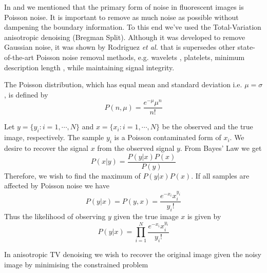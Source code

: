 \begin{definition}
	In  and  we mentioned that the primary form of noise in fluorescent images is Poisson noise. It is important to remove as much noise as possible without dampening the boundary information. To this end we've used the Total-Variation anisotropic denoising (Bregman Split). Although it was developed to remove Gaussian noise, it was shown by Rodriguez \textit{et al.}\citep{Rodriguez2008} that is supersedes other state-of-the-art Poisson noise removal methods, e.g.  wavelets \citep{Timmermann1999}, platelets\citep{Willett2004}, minimum description length \citep{Nowak1999}, while maintaining signal integrity. 
	
	The Poisson distribution, which has equal mean and standard deviation i.e. $\mu = \sigma$, is defined by
	\begin{equation}
	P(n,\mu) = \frac{e^{-\mu}\mu^{n}}{n!}
	\label{eq:poissondist}
	\end{equation}
	
	Let $y = \lbrace y_i:i=1, \cdots, N \rbrace$ and $x = \lbrace x_i:i=1, \cdots, N \rbrace$ be the observed and the true image, respectively. The sample $y_i$ is a Poisson contaminated form of $x_i$. We desire to recover the signal $x$ from the observed signal $y$. From Bayes' Law we get
	\begin{equation}
	P(x \vert y) = \frac{P(y \vert x)P(x)}{P(y)}
	\label{eq:bayeslaw}
	\end{equation}
	Therefore, we wish to find the maximum of $P(y \vert x)P(x)$. If all samples are affected by Poisson noise we have
	\begin{equation}
	P(y \vert x) = P(y,x) = \frac{e^{-x_i}x_i^{y_i}}{y_i!}
	\label{eq:poissonafect}
	\end{equation}
	Thus the likelihood of observing $y$ given the true image $x$ is given by
	\begin{equation}
	P(y \vert x) = \prod_{i=1}^{N} \frac{e^{-x_i}x_i^{y_i}}{y_i!}
	\label{eq:poissonlikelihood}
	\end{equation}
	
	
	In anisotropic TV denoising we wish to recover the original image given the noisy image by minimising the constrained problem
	

\end{definition}
